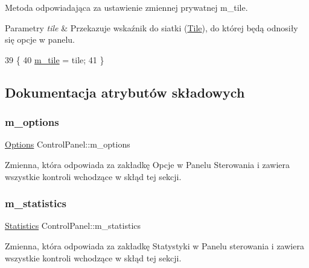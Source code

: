Metoda odpowiadająca za ustawienie zmiennej prywatnej m\+\_\+tile.


\begin{DoxyParams}{Parametry}
{\em tile} & Przekazuje wskaźnik do siatki (\mbox{\hyperlink{class_tile}{Tile}}), do której będą odnosiły się opcje w panelu. \\
\hline
\end{DoxyParams}

\begin{DoxyCode}
39 \{
40     \mbox{\hyperlink{class_control_panel_a9515f025047a35dba24b6ac94c7a55bd}{m\_tile}} = tile;
41 \}
\end{DoxyCode}


\subsection{Dokumentacja atrybutów składowych}
\mbox{\label{class_control_panel_a662113a86b5fa2be4790dd5b403e3f70}} 
\subsubsection{\texorpdfstring{m\+\_\+options}{m\_options}}
{\footnotesize\ttfamily \mbox{\hyperlink{class_options}{Options}} Control\+Panel\+::m\+\_\+options\hspace{0.3cm}{\ttfamily [private]}}

Zmienna, która odpowiada za zakładkę Opcje w Panelu Sterowania i zawiera wszystkie kontroli wchodzące w skłąd tej sekcji. \mbox{\label{class_control_panel_a330f6c6c7326c3b76b13e4423108fc88}} 
\subsubsection{\texorpdfstring{m\+\_\+statistics}{m\_statistics}}
{\footnotesize\ttfamily \mbox{\hyperlink{class_statistics}{Statistics}} Control\+Panel\+::m\+\_\+statistics\hspace{0.3cm}{\ttfamily [private]}}

Zmienna, która odpowiada za zakładkę Statystyki w Panelu sterowania i zawiera wszystkie kontroli wchodzące w skłąd tej sekcji. \mbox{\label{class_control_panel_a9515f025047a35dba24b6ac94c7a55bd}} 
